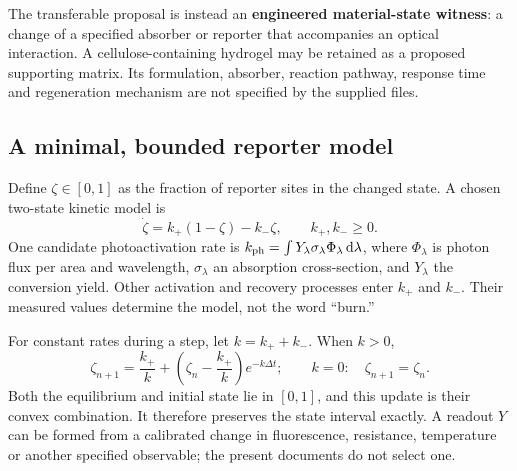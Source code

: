 \documentclass[10pt,a4paper]{article}
\numberwithin{equation}{section}
\newcommand{\dd}{\,\mathrm{d}}
\begin{document}
The transferable proposal is instead an \textbf{engineered material-state witness}: a change of a specified absorber or reporter that accompanies an optical interaction. A cellulose-containing hydrogel may be retained as a proposed supporting matrix. Its formulation, absorber, reaction pathway, response time and regeneration mechanism are not specified by the supplied files.

\subsection*{A minimal, bounded reporter model}
Define $\zeta\in[0,1]$ as the fraction of reporter sites in the changed state. A chosen two-state kinetic model is
\begin{equation}
\dot\zeta=k_+(1-\zeta)-k_-\zeta,\qquad k_+,k_-\ge0.
\end{equation}
One candidate photoactivation rate is $k_{\rm ph}=\int Y_\lambda\sigma_\lambda\Phi_\lambda\dd\lambda$, where $\Phi_\lambda$ is photon flux per area and wavelength, $\sigma_\lambda$ an absorption cross-section, and $Y_\lambda$ the conversion yield. Other activation and recovery processes enter $k_+$ and $k_-$. Their measured values determine the model, not the word ``burn.''

For constant rates during a step, let $k=k_++k_-$. When $k>0$,
\begin{equation}
\zeta_{n+1}=\frac{k_+}{k}
+\left(\zeta_n-\frac{k_+}{k}\right)e^{-k\Delta t};
\qquad k=0:\quad\zeta_{n+1}=\zeta_n.
\label{eq:reporter}
\end{equation}
Both the equilibrium and initial state lie in $[0,1]$, and this update is their convex combination. It therefore preserves the state interval exactly. A readout $Y$ can be formed from a calibrated change in fluorescence, resistance, temperature or another specified observable; the present documents do not select one.
\end{document}
